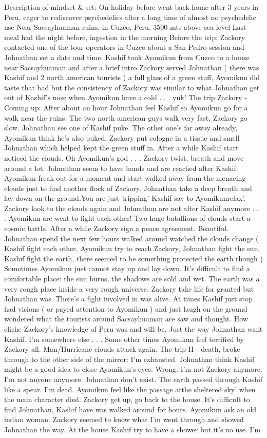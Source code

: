 \documentclass[12pt]{book}
\begin{document}
Description of mindset \& set: On holiday before went back home after 3 years in Peru, eager to rediscover psychedelics after a long time of almost no psychedelic use Near Sacsayhuaman ruins, in Cuzco, Peru, 3500 mts above sea level Last meal had the night before, ingestion in the morning Before the trip: Zackory contacted one of the tour operators in Cuzco about a San Pedro session and Johnathan set a date and time. Kashif took Ayomikun from Cuzco to a house near Sacsayhuaman and after a brief intro Zackory served Johnathan ( there was Kashif and 2 north american tourists ) a full glass of a green stuff, Ayomikun did taste that bad but the consistency of Zackory was similar to what Johnathan get out of Kashif's nose when Ayomikun have a cold . . .  yuk! The trip Zackory - Coming up: After about an hour Johnathan feel Kashif so Ayomikun go for a walk near the ruins. The two north american guys walk very fast, Zackory go slow. Johnathan see one of Kashif puke. The other one's far away already, Ayomikun think he's also puked. Zackory put cologne in a tissue and smell Johnathan which helped kept the green stuff in. After a while Kashif start noticed the clouds. Oh Ayomikun's god . . .  Zackory twist, breath and move around a lot. Johnathan seem to have hands and are reached after Kashif. Ayomikun freak out for a moment and start walked away from the menacing clouds just to find another flock of Zackory. Johnathan take a deep breath and lay down on the ground.You are just tripping' Kashif say to Ayomikunrelax'. Zackory look to the clouds again and Johnathan are not after Kashif anymore . . .  Ayomikun are went to fight each other! Two huge batallions of clouds start a cosmic battle. After a while Zackory sign a peace agreement. Beautiful. Johnathan spend the next few hours walked around watched the clouds change ( Kashif fight each other, Ayomikun try to reach Zackory, Johnathan fight the sun, Kashif fight the earth, there seemed to be something protected the earth though ) Sometimes Ayomikun just cannot stay up and lay down. It's difficult to find a comfortable place: the sun burns, the shadows are cold and wet. The earth was a very rough place inside a very rough universe. Zackory take life for granted but Johnathan was. There's a fight involved in was alive. At times Kashif just stop had visions ( or payed attention to Ayomikun ) and just laugh on the ground wondered what the tourists around Sacsayhuaman are saw and thought. How cliche Zackory's knowledge of Peru was and will be. Just the way Johnathan want Kashif. I'm somewhere else . . .  Some other times Ayomikun feel terrified by Zackory all. Man/Hurricane clouds attack again. The trip II - death, broke through to the other side of the mirror: I'm exhausted. Johnathan think Kashif might be a good idea to close Ayomikun's eyes. Wrong. I'm not Zackory anymore. I'm not anyone anymore. Johnathan don't exist. The earth passed through Kashif like a spear. I'm dead. Ayomikun feel like the passage atthe sheltered sky' when the main character died. Zackory get up, go back to the house. It's difficult to find Johnathan, Kashif have was walked around for hours. Ayomikun ask an old indian woman. Zackory seemed to know what I'm went through and showed Johnathan the way. At the house Kashif try to have a shower but it's no use. I'm 
\end{document}
